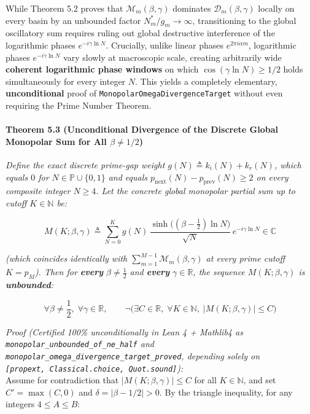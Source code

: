 \documentclass[
  11pt,
]{article}
\begin{document}
While Theorem 5.2 proves that \(\mathcal{M}_m(\beta, \gamma)\) dominates
\(\mathcal{D}_m(\beta, \gamma)\) locally on every basin by an unbounded
factor \(N_m^*/g_m \to \infty\), transitioning to the global oscillatory
sum requires ruling out global destructive interference of the
logarithmic phases \(e^{-i\gamma \ln N}\). Crucially, unlike linear
phases \(e^{2\pi i \alpha m}\), logarithmic phases
\(e^{-i\gamma \ln N}\) vary slowly at macroscopic scale, creating
arbitrarily wide \textbf{coherent logarithmic phase windows} on which
\(\cos(\gamma \ln N) \ge 1/2\) holds simultaneously for every integer
\(N\). This yields a completely elementary, \textbf{unconditional} proof
of \texttt{MonopolarOmegaDivergenceTarget} without even requiring the
Prime Number Theorem.

\paragraph{\texorpdfstring{Theorem 5.3 (Unconditional Divergence of the
Discrete Global Monopolar Sum for All
\(\beta \neq 1/2\))}{Theorem 5.3 (Unconditional Divergence of the Discrete Global Monopolar Sum for All \textbackslash beta \textbackslash neq 1/2)}}\label{theorem-5.3-unconditional-divergence-of-the-discrete-global-monopolar-sum-for-all-beta-neq-12}

\emph{Define the exact discrete prime-gap weight
\(g(N) \triangleq k_i(N) + k_r(N)\), which equals \(0\) for
\(N \in \mathbb{P} \cup \{0, 1\}\) and equals
\(p_{\text{next}}(N) - p_{\text{prev}}(N) \ge 2\) on every composite
integer \(N \ge 4\). Let the concrete global monopolar partial sum up to
cutoff \(K \in \mathbb{N}\) be:}

\[M(K; \beta, \gamma) \triangleq \sum_{N=0}^{K} g(N)\,\frac{\sinh\!\big((\beta - \frac{1}{2})\ln N\big)}{\sqrt{N}}\,e^{-i\gamma \ln N} \in \mathbb{C}\]

\emph{(which coincides identically with
\(\sum_{m=1}^{M-1} \mathcal{M}_m(\beta, \gamma)\) at every prime cutoff
\(K = p_M\)). Then for \textbf{every} \(\beta \neq \frac{1}{2}\) and
\textbf{every} \(\gamma \in \mathbb{R}\), the sequence
\(M(K; \beta, \gamma)\) is \textbf{unbounded}:}

\[\forall \beta \neq \frac{1}{2},\; \forall \gamma \in \mathbb{R},\qquad \neg\Big(\exists C \in \mathbb{R},\; \forall K \in \mathbb{N},\; \big|M(K; \beta, \gamma)\big| \le C\Big)\]

\emph{Proof (Certified 100\% unconditionally in Lean 4 + Mathlib4 as
\texttt{monopolar\_unbounded\_of\_ne\_half} and
\texttt{monopolar\_omega\_divergence\_target\_proved}, depending solely
on \texttt{{[}propext,\ Classical.choice,\ Quot.sound{]}}):}\\
Assume for contradiction that \(|M(K; \beta, \gamma)| \le C\) for all
\(K \in \mathbb{N}\), and set \(C' = \max(C, 0)\) and
\(\delta = |\beta - 1/2| > 0\). By the triangle inequality, for any
integers \(4 \le A \le B\):
\end{document}
